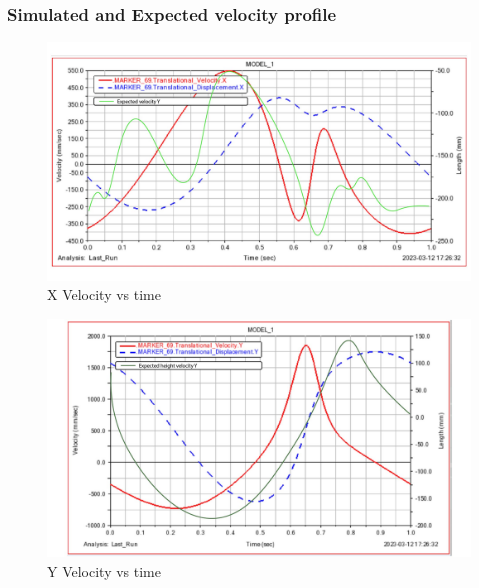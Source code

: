        \subsubsection{Simulated and Expected velocity profile}
            \begin{figure}[hbt!]
                \centering
                \includegraphics[width=0.9\columnwidth]{Images/x_vel madhav-01.jpg}
                \caption{X Velocity vs time}
                \label{fig:x_vel}
            \end{figure}

            \begin{figure}[hbt!]
                \centering
                \includegraphics[width=0.9\columnwidth]{Images/height_velocity madhav-01.jpg}
                \caption{Y Velocity vs time}
                \label{fig:y_vel}
            \end{figure}

